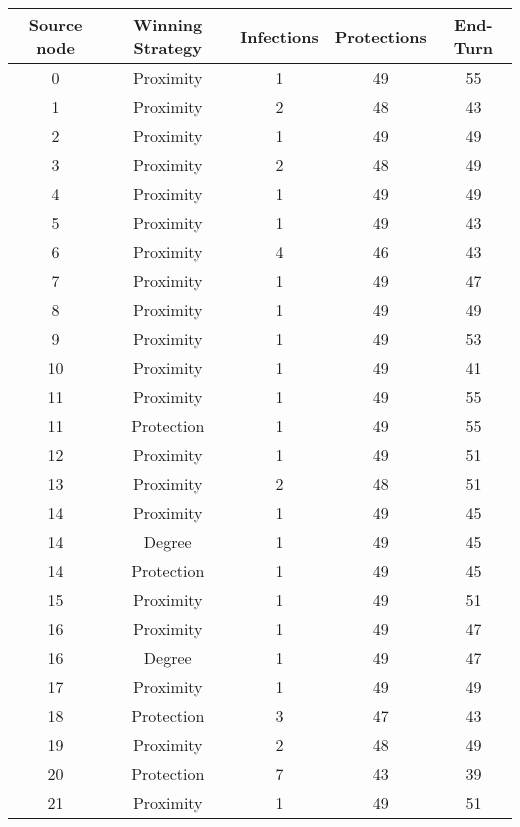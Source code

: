\documentclass[results.tex]{subfiles}
\begin{document}
\begin{center}
  \begin{tabular}{| c || c | c | c | c |}
    \hline
    {\bfseries Source node} & {\bfseries Winning Strategy} & {\bfseries Infections} & {\bfseries Protections} & {\bfseries End-Turn} \\  %
    \hline\hline
    0 & Proximity & 1 & 49 & 55 \\ 
    \hline
    1 & Proximity & 2 & 48 & 43 \\ 
    \hline
    2 & Proximity & 1 & 49 & 49 \\ 
    \hline
    3 & Proximity & 2 & 48 & 49 \\ 
    \hline
    4 & Proximity & 1 & 49 & 49 \\ 
    \hline
    5 & Proximity & 1 & 49 & 43 \\ 
    \hline
    6 & Proximity & 4 & 46 & 43 \\ 
    \hline
    7 & Proximity & 1 & 49 & 47 \\ 
    \hline
    8 & Proximity & 1 & 49 & 49 \\ 
    \hline
    9 & Proximity & 1 & 49 & 53 \\ 
    \hline
    10 & Proximity & 1 & 49 & 41 \\ 
    \hline
    11 & Proximity & 1 & 49 & 55 \\ 
    \hline
    11 & Protection & 1 & 49 & 55 \\ 
    \hline
    12 & Proximity & 1 & 49 & 51 \\ 
    \hline
    13 & Proximity & 2 & 48 & 51 \\ 
    \hline
    14 & Proximity & 1 & 49 & 45 \\ 
    \hline
    14 & Degree & 1 & 49 & 45 \\ 
    \hline
    14 & Protection & 1 & 49 & 45 \\ 
    \hline
    15 & Proximity & 1 & 49 & 51 \\ 
    \hline
    16 & Proximity & 1 & 49 & 47 \\ 
    \hline
    16 & Degree & 1 & 49 & 47 \\ 
    \hline
    17 & Proximity & 1 & 49 & 49 \\ 
    \hline
    18 & Protection & 3 & 47 & 43 \\ 
    \hline
    19 & Proximity & 2 & 48 & 49 \\ 
    \hline
    20 & Protection & 7 & 43 & 39 \\ 
    \hline
    21 & Proximity & 1 & 49 & 51 \\ 

\end{tabular}
\end{center}
\end{document}
